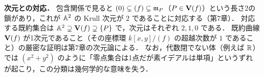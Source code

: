 \textbf{次元との対応．}
包含関係で見ると $(0)\subsetneq(f)\subsetneq\mathfrak{m}_P$（$P\in\mathbf{V}(f)$）という長さ2の鎖があり，これが $\mathbb{A}^2$ の Krull 次元が $2$ であることに対応する（第7章）．
対応する既約集合は $\mathbb{A}^2\supsetneq\mathbf{V}(f)\supsetneq\{P\}$ で，次元はそれぞれ $2,1,0$ である．
既約曲線 $\mathbf{V}(f)$ が1次元であること（その座標環 $k[x,y]/(f)$ の超越次数が $1$ であること）の厳密な証明は第7章の次元論による．
なお，代数閉でない体（例えば $\mathbb{R}$）では $(x^2+y^2)$ のように「零点集合は1点だが素イデアルは単項」というずれが起こり，この分類は幾何学的な意味を失う．
